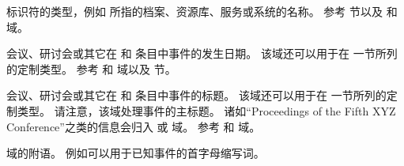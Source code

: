 \begin{fieldlist}

 标识符的类型，例如  所指的档案、资源库、服务或系统的名称。
参考  节以及  和  域。




会议、研讨会或其它在  和  条目中事件的发生日期。
该域还可以用于在  一节所列的定制类型。
参考  和  域以及  节。




会议、研讨会或其它在  和  条目中事件的标题。
该域还可以用于在  一节所列的定制类型。
请注意，该域处理事件的主标题。
诸如“Proceedings of the Fifth XYZ Conference”之类的信息会归入  或  域。
参考  和  域。




 域的附语。
例如可以用于已知事件的首字母缩写词。




\end{fieldlist}
